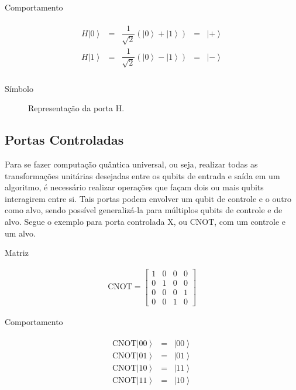 Comportamento

\[\begin{aligned}
\begin{matrix}
    H \left| 0 \right\rangle &=& \dfrac{1}{\sqrt{2}} \left( \left| 0 \right\rangle + \left| 1 \right\rangle \right) &=& \left| + \right\rangle \\
    H \left| 1 \right\rangle &=& \dfrac{1}{\sqrt{2}} \left( \left| 0 \right\rangle - \left| 1 \right\rangle \right) &=& \left| - \right\rangle \\
\end{matrix}
\end{aligned}\]

Símbolo

\begin{figure}[!htp]
    \centering
    
    \caption{Representação da porta H.}
    \label{fig:hgate}
\end{figure}


\subsection{Portas Controladas}\label{subsec:portas-controladas}

Para se fazer computação quântica universal, ou seja, realizar todas as
transformações unitárias desejadas entre os qubits de entrada e saída em
um algoritmo, é necessário realizar operações que façam dois ou mais
qubits interagirem entre si.
Tais portas podem envolver um qubit de controle e o outro como alvo, sendo possível generalizá-la para
múltiplos qubits de controle e de alvo.
Segue o exemplo para porta controlada X, ou CNOT, com um controle e um alvo.

Matriz

\[\begin{aligned}
\text{CNOT} =
\begin{bmatrix}
    1 & 0 & 0 & 0 \\
    0 & 1 & 0 & 0 \\
    0 & 0 & 0 & 1 \\
    0 & 0 & 1 & 0
\end{bmatrix}
\end{aligned}\]

Comportamento

\[\begin{aligned}
\begin{matrix}
    \text{CNOT} \left| 00 \right\rangle &=& \left| 00 \right\rangle \\
    \text{CNOT} \left| 01 \right\rangle &=& \left| 01 \right\rangle \\
    \text{CNOT} \left| 10 \right\rangle &=& \left| 11 \right\rangle \\
    \text{CNOT} \left| 11 \right\rangle &=& \left| 10 \right\rangle
\end{matrix}
\end{aligned}\]

